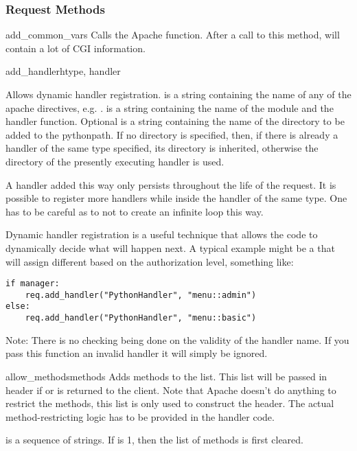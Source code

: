 \subsubsection{Request Methods\label{pyapi-mprequest-meth}}

\begin{methoddesc}[Request]{add_common_vars}{}
Calls the Apache  function. After a
call to this method,  will contain a
lot of CGI information.
\end{methoddesc}

\begin{methoddesc}[Request]{add_handler}{htype, handler}

Allows dynamic handler registration.  is a string
containing the name of any of the apache 
directives, e.g. .  is a string
containing the name of the module and the handler function.  Optional
 is a string containing the name of the directory to be added
to the pythonpath. If no directory is specified, then, if there is
already a handler of the same type specified, its directory is
inherited, otherwise the directory of the presently executing handler
is used.
                  
A handler added this way only persists throughout the life of the
request. It is possible to register more handlers while inside the
handler of the same type. One has to be careful as to not to create an
infinite loop this way.

Dynamic handler registration is a useful technique that allows the
code to dynamically decide what will happen next. A typical example
might be a  that will assign different
 based on the authorization level, something like:

\begin{verbatim}
if manager:
    req.add_handler("PythonHandler", "menu::admin")
else:
    req.add_handler("PythonHandler", "menu::basic")
\end{verbatim}                              

Note: There is no checking being done on the validity of the handler
name. If you pass this function an invalid handler it will simply be
ignored.
\end{methoddesc}

\begin{methoddesc}[Request]{allow_methods}{methods}
Adds methods to the  list. This list
will be passed in  header if
 or 
is returned to the client. Note that Apache doesn't do anything to
restrict the methods, this list is only used to construct the
header. The actual method-restricting logic has to be provided in the
handler code.

 is a sequence of strings. If  is 1, then
the list of methods is first cleared.
\end{methoddesc}

